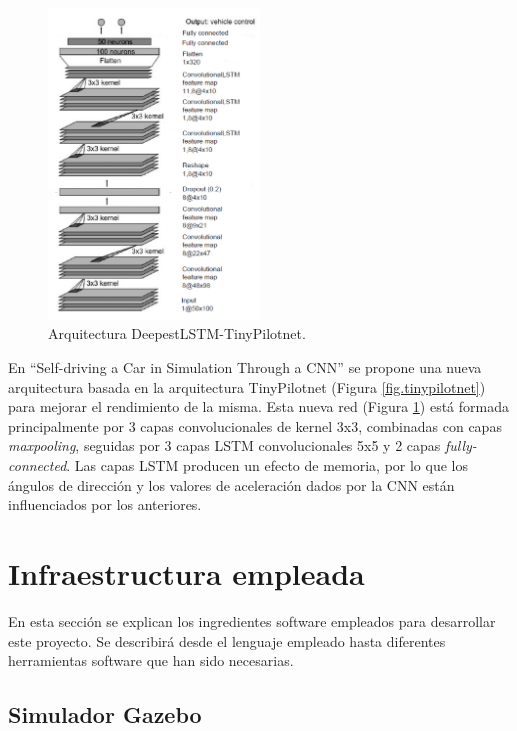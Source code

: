 \begin{figure}
\begin{center}
	\includegraphics[width=0.5\textwidth]{figures/Estado_arte/deepestlstm.png}
   \caption{Arquitectura DeepestLSTM-TinyPilotnet.}
	\label{fig.deepestlstm}
\end{center}
\end{figure}

En ``Self-driving  a  Car  in  Simulation  Through  a  CNN'' \cite{self-driving} se propone una nueva arquitectura basada en la arquitectura TinyPilotnet (Figura \ref{fig.tinypilotnet}) para mejorar el rendimiento de la misma. Esta nueva red (Figura \ref{fig.deepestlstm}) está formada principalmente por 3 capas convolucionales de kernel 3x3, combinadas con capas \textit{maxpooling}, seguidas por 3 capas LSTM convolucionales 5x5 y 2 capas \textit{fully-connected}. Las capas LSTM producen un efecto de memoria, por lo que los ángulos de dirección y los valores de aceleración dados por la CNN están influenciados por los anteriores. \\


\section{Infraestructura empleada}

En esta sección se explican los ingredientes software empleados para desarrollar este proyecto. Se describirá desde el lenguaje empleado hasta diferentes herramientas software que han sido necesarias.

\subsection{Simulador Gazebo}

